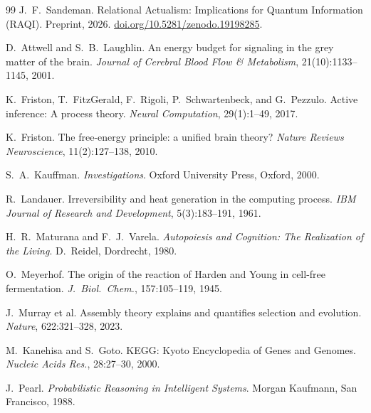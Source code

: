 \documentclass[11pt,a4paper]{article}
\theoremstyle{remark}
\begin{document}
\begin{thebibliography}{99}
J.~F.~Sandeman.
\newblock Relational Actualism: Implications for Quantum Information ({RAQI}).
\newblock Preprint, 2026.
\newblock \href{https://doi.org/10.5281/zenodo.19198285}{doi.org/10.5281/zenodo.19198285}.

D.~Attwell and S.~B.~Laughlin.
\newblock An energy budget for signaling in the grey matter of the brain.
\newblock \textit{Journal of Cerebral Blood Flow \& Metabolism}, 21(10):1133--1145, 2001.

K.~Friston, T.~FitzGerald, F.~Rigoli, P.~Schwartenbeck, and G.~Pezzulo.
\newblock Active inference: A process theory.
\newblock \textit{Neural Computation}, 29(1):1--49, 2017.

K.~Friston.
\newblock The free-energy principle: a unified brain theory?
\newblock \textit{Nature Reviews Neuroscience}, 11(2):127--138, 2010.

S.~A.~Kauffman.
\newblock \textit{Investigations}.
\newblock Oxford University Press, Oxford, 2000.

R.~Landauer.
\newblock Irreversibility and heat generation in the computing process.
\newblock \textit{IBM Journal of Research and Development}, 5(3):183--191, 1961.

H.~R.~Maturana and F.~J.~Varela.
\newblock \textit{Autopoiesis and Cognition: The Realization of the Living}.
\newblock D.~Reidel, Dordrecht, 1980.

O.~Meyerhof.
\newblock The origin of the reaction of Harden and Young in cell-free
  fermentation.
\newblock \textit{J.\ Biol.\ Chem.}, 157:105--119, 1945.

J.~Murray et al.
\newblock Assembly theory explains and quantifies selection and evolution.
\newblock \textit{Nature}, 622:321--328, 2023.

M.~Kanehisa and S.~Goto.
\newblock KEGG: Kyoto Encyclopedia of Genes and Genomes.
\newblock \textit{Nucleic Acids Res.}, 28:27--30, 2000.

J.~Pearl.
\newblock \textit{Probabilistic Reasoning in Intelligent Systems}.
\newblock Morgan Kaufmann, San Francisco, 1988.


\end{thebibliography}
\end{document}
